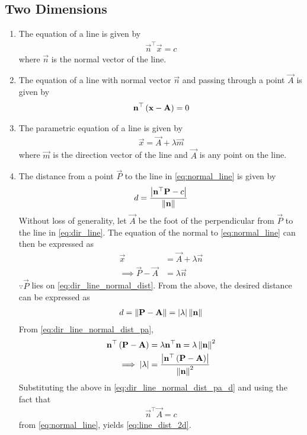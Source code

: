 \documentclass[journal,12pt,twocolumn]{IEEEtran}
\renewcommand\thesection{\arabic{section}}
\renewcommand\thesubsection{\thesection.\arabic{subsection}}
\begin{document}
\subsection{Two Dimensions}
\renewcommand{\theequation}{\theenumi}
\begin{enumerate}[label=\thesubsection.\arabic*.,ref=\thesubsection.\theenumi]
\item The equation of a line  is given by  
\begin{align}
	\label{eq:normal_line}
   \vec{n}^{\top}\vec{x} = c
\end{align}
		where $\vec{n}$ is the normal vector of the line.
	\item The equation of a line with normal vector $\vec{n}$ and passing through a point $\vec{A}$ 
		is given by 
\begin{align}
	\label{eq:normal_line_pt}
	\mathbf{n}^{\top}\left(\mathbf{x}-\mathbf{A}\right) =0 
\end{align}
\item The parametric equation of a line  is given by  
\begin{align}
	\label{eq:dir_line}
	\vec{x} = \vec{A} + \lambda \vec{m}
\end{align}
		where $\vec{m}$ is the direction vector of the line and $\vec{A}$ is any point on the line.
	\item The distance from a point $\vec{P}$ to the line  in 
	\eqref{eq:normal_line}
	is given by 
\begin{align}
	\label{eq:line_dist_2d}
	d = \frac{\left\vert   \mathbf{n}^{\top}\mathbf{P}-c \right\vert}{\left\lVert\mathbf{n}\right\rVert}	
\end{align}
		\solution Without loss of generality, let $\vec{A}$ be the foot of the perpendicular from $\vec{P}$ to the line in 
	\eqref{eq:dir_line}.  The equation of the normal to 
	\eqref{eq:normal_line} can then be expressed as 
\begin{align}
	\label{eq:dir_line_normal_dist}
	\vec{x} &= \vec{A} + \lambda \vec{n}
	\\
	\implies 
	\vec{P}- \vec{A} &=  \lambda \vec{n}
	\label{eq:dir_line_normal_dist_pa}
\end{align}
$\because \vec{P}$ lies on 
		\eqref{eq:dir_line_normal_dist}.
From the above, the desired distance can be expressed as 
\begin{align}
d = 	\left\lVert\mathbf{P}- \mathbf{A}\right\rVert= \left\vert\lambda\right\vert \left\lVert\mathbf{n}\right\rVert
	\label{eq:dir_line_normal_dist_pa_d}
\end{align}
From 
	\eqref{eq:dir_line_normal_dist_pa},
\begin{align}
	\mathbf{n}^{\top}
	\left(\mathbf{P}- \mathbf{A}\right) &=  \lambda \mathbf{n}^{\top}\mathbf{n} = \lambda\left\lVert\mathbf{n}\right\rVert^2
	\\
	\implies \left\vert\lambda\right\vert&= \frac{\left\vert\mathbf{n}^{\top}
	\left(\mathbf{P}- \mathbf{A}\right)\right\vert}{\left\lVert\mathbf{n}\right\rVert^2} 
\end{align}
	Substituting the above in \eqref{eq:dir_line_normal_dist_pa_d} and using 
	the fact that 
\begin{align}
   \vec{n}^{\top}\vec{A} = c
\end{align}
from 	\eqref{eq:normal_line}, yields 
	\eqref{eq:line_dist_2d}.


\end{enumerate}
\end{document}

